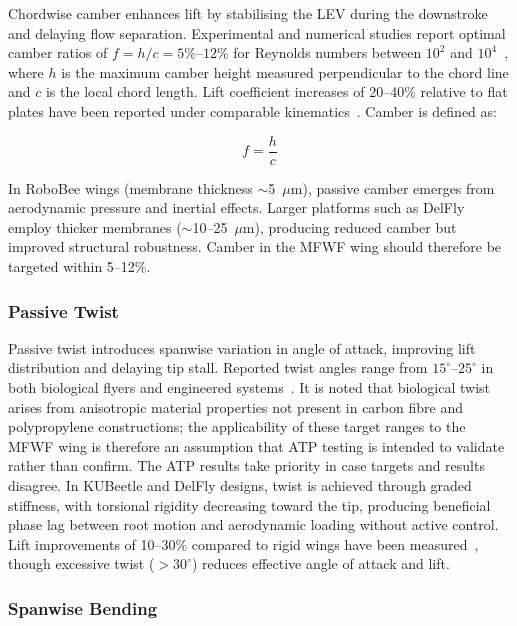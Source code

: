 Chordwise camber enhances lift by stabilising the LEV during the downstroke and delaying flow separation. Experimental and numerical studies report optimal camber ratios of $f = h/c = 5\%$--$12\%$ for Reynolds numbers between $10^2$ and $10^4$~\cite{wu2011aerodynamic, du2010aerodynamics}, where $h$ is the maximum camber height measured perpendicular to the chord line and $c$ is the local chord length. Lift coefficient increases of 20--40\% relative to flat plates have been reported under comparable kinematics~\cite{luo2013effect}. Camber is defined as:

\begin{equation}
    f = \frac{h}{c}
\end{equation}

In RoboBee wings (membrane thickness $\sim$5~$\mu$m), passive camber emerges from aerodynamic pressure and inertial effects. Larger platforms such as DelFly employ thicker membranes ($\sim$10--25~$\mu$m), producing reduced camber but improved structural robustness. Camber in the MFWF wing should therefore be targeted within 5--12\%.

\subsubsection{Passive Twist}

Passive twist introduces spanwise variation in angle of attack, improving lift distribution and delaying tip stall. Reported twist angles range from $15^\circ$--$25^\circ$ in both biological flyers and engineered systems~\cite{yoon2014effect, kraemer2012rapid}. It is noted that biological twist arises from anisotropic material properties not present in carbon fibre and polypropylene constructions; the applicability of these target ranges to the MFWF wing is therefore an assumption that ATP testing is intended to validate rather than confirm. The ATP results take priority in case targets and results disagree. In KUBeetle and DelFly designs, twist is achieved through graded stiffness, with torsional rigidity decreasing toward the tip, producing beneficial phase lag between root motion and aerodynamic loading without active control. Lift improvements of 10--30\% compared to rigid wings have been measured~\cite{mountcastle2010aerodynamic}, though excessive twist ($>30^\circ$) reduces effective angle of attack and lift.

\subsubsection{Spanwise Bending}

